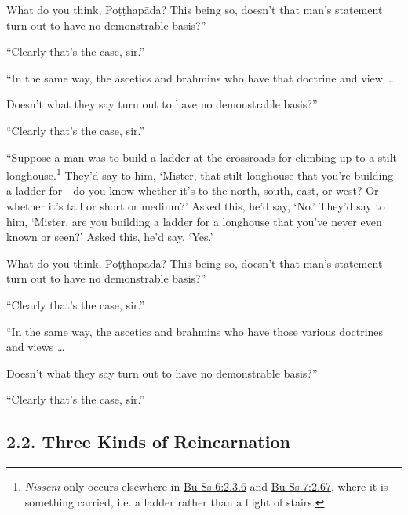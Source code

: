 \documentclass[12pt,openany]{book}%
\begin{document}
What do you think, \textsanskrit{Poṭṭhapāda}? This being so, doesn’t that man’s statement turn out to have no demonstrable basis?” 

“Clearly that’s the case, sir.” 

“In the same way, the ascetics and brahmins who have that doctrine and view … 

Doesn’t what they say turn out to have no demonstrable basis?” 

“Clearly that’s the case, sir.” 

“Suppose a man was to build a ladder at the crossroads for climbing up to a stilt longhouse.\footnote{\textit{Nisseni} only occurs elsewhere in \href{https://suttacentral.net/pli-tv-bu-vb-ss6/en/sujato\#2.3.6}{Bu Ss 6:2.3.6} and \href{https://suttacentral.net/pli-tv-bu-vb-ss7/en/sujato\#2.67}{Bu Ss 7:2.67}, where it is something carried, i.e. a ladder rather than a flight of stairs. } They’d say to him, ‘Mister, that stilt longhouse that you’re building a ladder for—do you know whether it’s to the north, south, east, or west? Or whether it’s tall or short or medium?’ Asked this, he’d say, ‘No.’ They’d say to him, ‘Mister, are you building a ladder for a longhouse that you’ve never even known or seen?’ Asked this, he’d say, ‘Yes.’ 

What do you think, \textsanskrit{Poṭṭhapāda}? This being so, doesn’t that man’s statement turn out to have no demonstrable basis?” 

“Clearly that’s the case, sir.” 

“In the same way, the ascetics and brahmins who have those various doctrines and views … 

Doesn’t what they say turn out to have no demonstrable basis?” 

“Clearly that’s the case, sir.” 

\subsection*{2.2. Three Kinds of Reincarnation }
\end{document}
